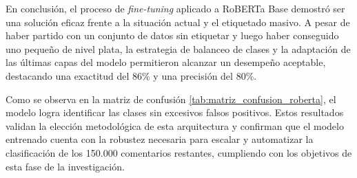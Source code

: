 En conclusión, el proceso de \textit{fine-tuning} aplicado a RoBERTa Base demostró ser una solución eficaz frente a la situación actual y el etiquetado masivo. A pesar de haber partido con un conjunto de datos sin etiquetar y luego  haber conseguido uno pequeño de nivel plata, la estrategia de balanceo de clases y la adaptación de las últimas capas del modelo permitieron alcanzar un desempeño aceptable, destacando una exactitud del 86\% y una precisión del 80\%. 

Como se observa en la matriz de confusión \ref{tab:matriz_confusion_roberta}, el modelo logra identificar las clases sin excesivos falsos positivos. Estos resultados validan la elección metodológica de esta arquitectura y confirman que el modelo entrenado cuenta con la robustez necesaria para escalar y automatizar la clasificación de los 150.000 comentarios restantes, cumpliendo con los objetivos de esta fase de la investigación.
